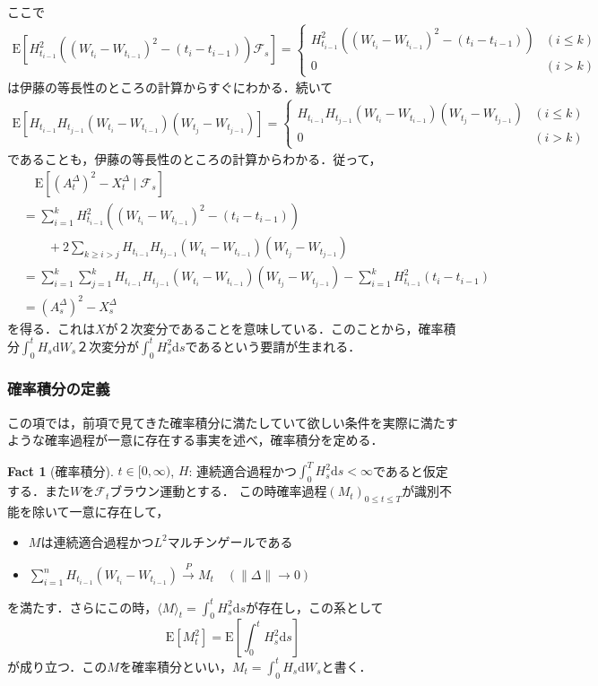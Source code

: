 \documentclass{jsarticle}
\theoremstyle{definition}
\newtheorem{fact}[dfn]{Fact}
\begin{document}
ここで
\begin{align*}
    \mathrm{E}\left[H_{t_{i-1}}^2\left((W_{t_i}-W_{t_{i-1}})^2 - (t_i - t_{i-1})\right)\mathscr{F}_s\right] = \begin{cases}
        H_{t_{i-1}}^2\left((W_{t_i}-W_{t_{i-1}})^2 - (t_i - t_{i-1})\right) & (i \leq k)\\
        0 & (i > k)
    \end{cases}
\end{align*}
は伊藤の等長性のところの計算からすぐにわかる．続いて
\begin{align*}
    \mathrm{E}\left[H_{t_{i-1}}H_{t_{j-1}}(W_{t_i}-W_{t_{i-1}}) (W_{t_j} - W_{t_{j-1}})\right] = 
    \begin{cases}
        H_{t_{i-1}}H_{t_{j-1}}(W_{t_i}-W_{t_{i-1}}) (W_{t_j} - W_{t_{j-1}}) & (i \leq k)\\
        0 & (i > k)
    \end{cases}
\end{align*}
であることも，伊藤の等長性のところの計算からわかる．従って，
\begin{align*}
    &\quad\mathrm{E}\left[(A_t^\Delta)^2 - X_t^\Delta \mid \mathscr{F}_s\right] \\
    &= \sum_{i=1}^k H_{t_{i-1}}^2\left((W_{t_i}-W_{t_{i-1}})^2 - (t_i - t_{i-1})\right) \\
    &\qquad + 2\sum_{k \geq i > j}H_{t_{i-1}}H_{t_{j-1}}(W_{t_i}-W_{t_{i-1}}) (W_{t_j} - W_{t_{j-1}})\\
    &= \sum_{i=1}^k\sum_{j=1}^k H_{t_{i-1}}H_{t_{j-1}}(W_{t_i}-W_{t_{i-1}}) (W_{t_j} - W_{t_{j-1}}) - \sum_{i=1}^{k}H_{t_{i-1}}^2 (t_i - t_{i-1})\\
    &= (A_s^\Delta)^2 - X_s^\Delta
\end{align*}
を得る．これは$X$が２次変分であることを意味している．このことから，確率積分$\int_0^tH_s\mathrm{d}W_s$２次変分が$\int_0^t H_s^2\mathrm{d}s$であるという要請が生まれる．

\subsubsection{確率積分の定義}
この項では，前項で見てきた確率積分に満たしていて欲しい条件を実際に満たすような確率過程が一意に存在する事実を述べ，確率積分を定める．
\begin{fact}[確率積分]
    $t\in[0, \infty)$, $H$: 連続適合過程かつ$\int_0^T H_s^2\mathrm{d}s < \infty$であると仮定する．また$W$を$\mathscr{F}_t$ブラウン運動とする．
    この時確率過程$(M_t)_{0\leq t\leq T}$が識別不能を除いて一意に存在して，
    \begin{itemize}
        \item $M$は連続適合過程かつ$L^2$マルチンゲールである
        \item $\sum_{i=1}^n H_{t_{i-1}}(W_{t_i} - W_{t_{i-1}}) \overset{P}{\rightarrow} M_t \quad (\|\Delta\|\rightarrow 0)$
    \end{itemize}
    を満たす．さらにこの時，$\langle M\rangle_t = \int_0^t H_s^2\mathrm{d}s$が存在し，この系として
    $$
        \mathrm{E}\left[M_t^2\right] = \mathrm{E}\left[\int_0^t H_s^2\mathrm{d}s\right]
    $$
    が成り立つ．この$M$を確率積分といい，$M_t = \int_0^tH_s\mathrm{d}W_s$と書く．
\end{fact}
\end{document}
